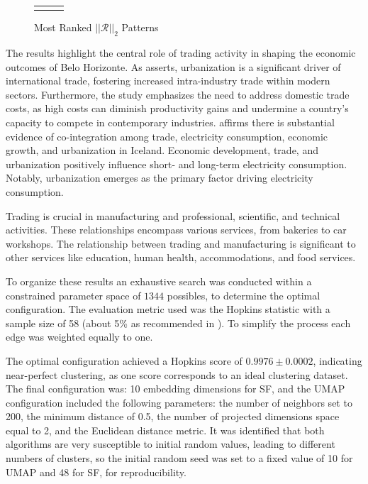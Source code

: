 \documentclass[12pt]{article}
\begin{document}
\begin{figure}[H]
\begin{tabular}{ccc}
{{    }
} \\
\end{tabular}
\caption{Most Ranked $|| \mathcal{R} ||_{2}$ Patterns}
\label{grf:freq_RR2}
\end{figure}

The results highlight the central role of trading activity in shaping the economic outcomes of Belo Horizonte. As \cite{thia2016trade} asserts, urbanization is a significant driver of international trade, fostering increased intra-industry trade within modern sectors. Furthermore, the study emphasizes the need to address domestic trade costs, as high costs can diminish productivity gains and undermine a country’s capacity to compete in contemporary industries. \cite{faisal2018electricity} affirms there is substantial evidence of co-integration among trade, electricity consumption, economic growth, and urbanization in Iceland. Economic development, trade, and urbanization positively influence short- and long-term electricity consumption. Notably, urbanization emerges as the primary factor driving electricity consumption.

Trading is crucial in manufacturing and professional, scientific, and technical activities. These relationships encompass various services, from bakeries to car workshops. The relationship between trading and manufacturing is significant to other services like education, human health, accommodations, and food services.

To organize these results an exhaustive search was conducted within a constrained parameter space of $1344$ possibles, to determine the optimal configuration. The evaluation metric used was the Hopkins statistic \cite{banerjee2004validating} with a sample size of 58 (about 5\% as recommended in \cite{lawson1990new}). To simplify the process each edge was weighted equally to one.

The optimal configuration achieved a Hopkins score of $0.9976 \pm 0.0002$, indicating near-perfect clustering, as one score corresponds to an ideal clustering dataset. The final configuration was: 10 embedding dimensions for SF, and the UMAP configuration included the following parameters: the number of neighbors set to 200, the minimum distance of 0.5, the number of projected dimensions space equal to 2, and the Euclidean distance metric. It was identified that both algorithms are very susceptible to initial random values, leading to different numbers of clusters, so the initial random seed was set to a fixed value of 10 for UMAP and 48 for SF, for reproducibility.
\end{document}
